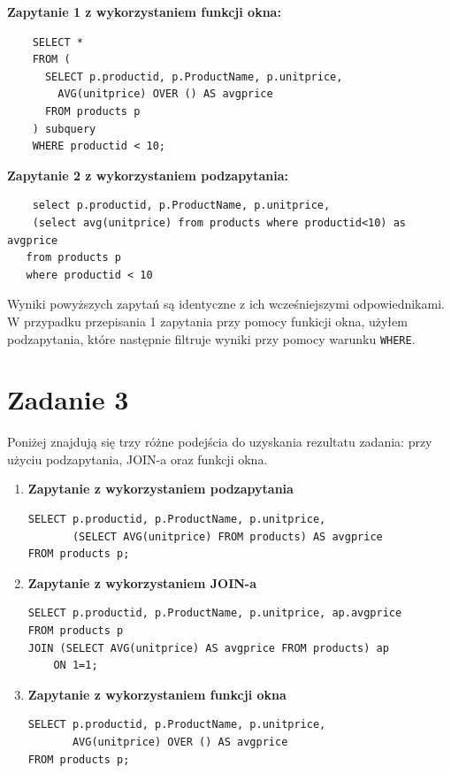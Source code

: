 \documentclass{article}
\begin{document}
\textbf{Zapytanie 1 z wykorzystaniem funkcji okna:}
\begin{lstlisting}
    SELECT *
    FROM (
      SELECT p.productid, p.ProductName, p.unitprice,
        AVG(unitprice) OVER () AS avgprice
      FROM products p
    ) subquery
    WHERE productid < 10;
\end{lstlisting}

\textbf{Zapytanie 2 z wykorzystaniem podzapytania:}
\begin{lstlisting} 
    select p.productid, p.ProductName, p.unitprice,
    (select avg(unitprice) from products where productid<10) as avgprice
   from products p
   where productid < 10
\end{lstlisting}

Wyniki powyższych zapytań są identyczne z ich wcześniejszymi odpowiednikami. W przypadku przepisania 1 zapytania przy pomocy funkicji okna,
użyłem podzapytania, które następnie filtruje wyniki przy pomocy warunku \texttt{WHERE}.

\section*{Zadanie 3}

Poniżej znajdują się trzy różne podejścia do uzyskania rezultatu zadania: przy użyciu podzapytania, JOIN-a oraz funkcji okna.

\begin{enumerate}
    \item \textbf{Zapytanie z wykorzystaniem podzapytania}
    \begin{lstlisting}[caption={Subquery}]
SELECT p.productid, p.ProductName, p.unitprice,
       (SELECT AVG(unitprice) FROM products) AS avgprice
FROM products p;
    \end{lstlisting}

    \item \textbf{Zapytanie z wykorzystaniem JOIN-a}
    \begin{lstlisting}[caption={JOIN}]
SELECT p.productid, p.ProductName, p.unitprice, ap.avgprice
FROM products p
JOIN (SELECT AVG(unitprice) AS avgprice FROM products) ap
    ON 1=1;
    \end{lstlisting}

    \item \textbf{Zapytanie z wykorzystaniem funkcji okna}
    \begin{lstlisting}[caption={Funkcja okna}]
SELECT p.productid, p.ProductName, p.unitprice,
       AVG(unitprice) OVER () AS avgprice
FROM products p;
    \end{lstlisting}
\end{enumerate}
\end{document}
